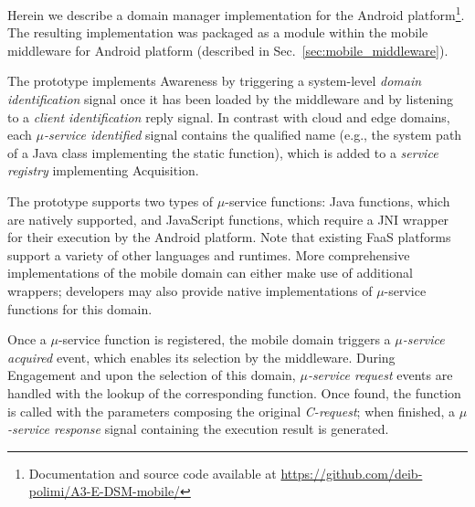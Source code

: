 Herein we describe a domain manager implementation for the Android platform\footnote{Documentation and source code available at \url{https://github.com/deib-polimi/A3-E-DSM-mobile/}}. 
The resulting implementation was packaged as a module within the mobile middleware for Android platform (described in Sec.~\ref{sec:mobile_middleware}). 

The prototype implements Awareness by triggering a system-level \textit{domain identification} signal once it has been loaded by the middleware and by listening to a \textit{client identification} reply signal. 
In contrast with cloud and edge domains, 
each \textit{$\mu$-service identified} signal contains the qualified name (e.g., the system path of a Java class implementing the static function), which is added to a \textit{service registry} implementing Acquisition. 

The prototype supports two types of $\mu$-service functions: Java functions, which are natively supported, and JavaScript functions, which require a JNI wrapper for their execution by the Android platform. Note that existing FaaS platforms support a variety of other languages and runtimes. More comprehensive implementations of the mobile domain can either make use of additional wrappers; developers may also provide native implementations of $\mu$-service functions for this domain. 


Once a $\mu$-service function is registered, the mobile domain triggers a \textit{$\mu$-service acquired} event, which enables its selection by the middleware. During Engagement and upon the selection of this domain, \textit{$\mu$-service request} events are handled with the lookup of the corresponding function. Once found, the function is called with the parameters composing the original \textit{C-request}; when finished, a \textit{$\mu$-service response} signal containing the execution result is generated.



